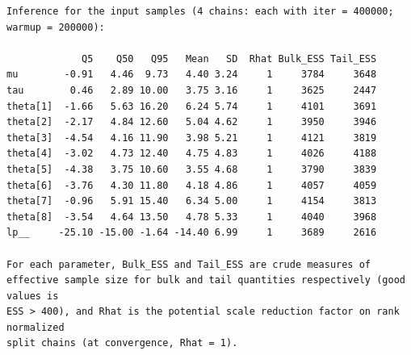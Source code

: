 \documentclass[american,]{article}
\begin{document}
\begin{verbatim}
Inference for the input samples (4 chains: each with iter = 400000; warmup = 200000):

             Q5    Q50   Q95   Mean   SD  Rhat Bulk_ESS Tail_ESS
mu        -0.91   4.46  9.73   4.40 3.24     1     3784     3648
tau        0.46   2.89 10.00   3.75 3.16     1     3625     2447
theta[1]  -1.66   5.63 16.20   6.24 5.74     1     4101     3691
theta[2]  -2.17   4.84 12.60   5.04 4.62     1     3950     3946
theta[3]  -4.54   4.16 11.90   3.98 5.21     1     4121     3819
theta[4]  -3.02   4.73 12.40   4.75 4.83     1     4026     4188
theta[5]  -4.38   3.75 10.60   3.55 4.68     1     3790     3839
theta[6]  -3.76   4.30 11.80   4.18 4.86     1     4057     4059
theta[7]  -0.96   5.91 15.40   6.34 5.00     1     4154     3813
theta[8]  -3.54   4.64 13.50   4.78 5.33     1     4040     3968
lp__     -25.10 -15.00 -1.64 -14.40 6.99     1     3689     2616

For each parameter, Bulk_ESS and Tail_ESS are crude measures of 
effective sample size for bulk and tail quantities respectively (good values is 
ESS > 400), and Rhat is the potential scale reduction factor on rank normalized
split chains (at convergence, Rhat = 1).
\end{verbatim}
\end{document}
